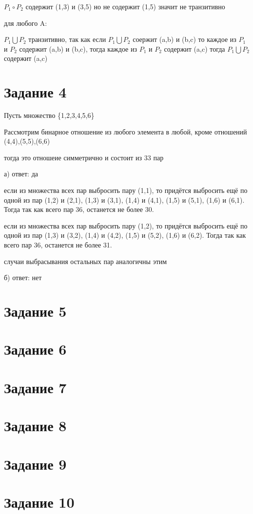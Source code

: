 \documentclass[a4paper, 12pt]{article}
\renewcommand{\u}{\bigcup{}}
\begin{document}
		$P_1\circ P_2$ содержит (1,3) и (3,5) но не содержит (1,5) значит не транзитивно

		для любого A:

		$P_1\u P_2$ транзитивно, так как если $P_1\u P_2$ соержит (a,b) и (b,c) то каждое из $P_1$ и $P_2$ содержит (a,b) и (b,c), тогда каждое из $P_1$ и $P_2$ содержит (a,c) тогда $P_1\u P_2$ содержит (a,c)

	\section*{Задание 4}
		Пусть множество \{1,2,3,4,5,6\}
		
		Рассмотрим бинарное отношение из любого элемента в любой, кроме отношений (4,4),(5,5),(6,6)

		тогда это отношеие симметрично и состоит из 33 пар

		а) ответ: да

		если из множества всех пар выбросить пару (1,1), то придётся выбросить ещё по одной из пар (1,2) и (2,1), (1,3) и (3,1), (1,4) и (4,1), (1,5) и (5,1), (1,6) и (6,1). Тогда так как всего пар 36, останется не более 30.

		если из множества всех пар выбросить пару (1,2), то придётся выбросить ещё по одной из пар (1,3) и (3,2), (1,4) и (4,2), (1,5) и (5,2), (1,6) и (6,2). Тогда так как всего пар 36, останется не более 31.

		случаи выбрасывания остальных пар аналогичны этим

		б) ответ: нет
	\section*{Задание 5}
	\section*{Задание 6}
	\section*{Задание 7}
	\section*{Задание 8}
	\section*{Задание 9}
	\section*{Задание 10}
\end{document}

